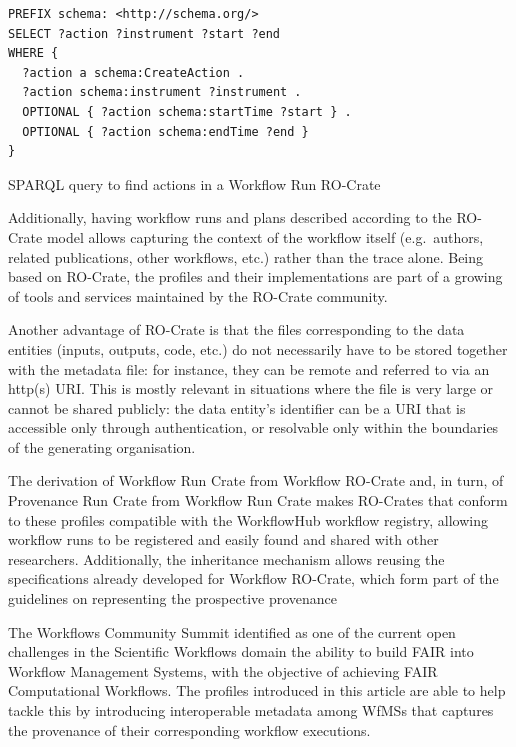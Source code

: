 \begin{listing}
\begin{verbatim}
PREFIX schema: <http://schema.org/>
SELECT ?action ?instrument ?start ?end
WHERE {
  ?action a schema:CreateAction .
  ?action schema:instrument ?instrument .
  OPTIONAL { ?action schema:startTime ?start } .
  OPTIONAL { ?action schema:endTime ?end }
}
\end{verbatim}
\caption{SPARQL query to find actions in a Workflow Run RO-Crate}
\label{ch54:sparql}
\end{listing}

Additionally, having workflow runs and plans described according to the RO-Crate model allows capturing the context of the workflow itself (e.g.~authors, related publications, other workflows, etc.) rather than the trace alone. 
Being based on RO-Crate, the profiles and their implementations are part of a growing  of tools and services maintained by the RO-Crate community. 

Another advantage of RO-Crate is that the files corresponding to the data entities (inputs, outputs, code, etc.) do not necessarily have to be stored together with the metadata file: for instance, they can be remote and referred to via an http(s) URI. This is mostly relevant in situations where the file is very large or cannot be shared publicly: the data entity's identifier can be a URI that is accessible only through authentication, or resolvable only within the boundaries of the generating organisation.

The derivation of Workflow Run Crate from Workflow RO-Crate and, in turn, of Provenance Run Crate from Workflow Run Crate makes RO-Crates that conform to these profiles compatible with the WorkflowHub workflow registry, allowing workflow runs to be registered and easily found and shared with other researchers. Additionally, the inheritance mechanism allows reusing the specifications already developed for Workflow RO-Crate, which form part of the guidelines on representing the prospective provenance

The Workflows Community Summit \cite{Ferreira da Silva} identified as one of the current open challenges in the Scientific Workflows domain the ability to build \acrshort{FAIR} into Workflow Management Systems, with the objective of achieving FAIR Computational Workflows. The profiles introduced in this article are able to help tackle this by introducing interoperable metadata among WfMSs that captures the provenance of their corresponding workflow executions.

